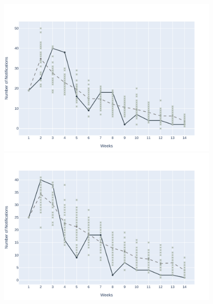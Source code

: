 \begin{figure}[!ht]
	\begin{minipage}[c]{.45\textwidth}
		\centering
		\includegraphics[scale=0.4]{images/experiments-as/AS-2017-01-08.pdf}
	\end{minipage}
	\hspace{0.5cm}
	\begin{minipage}[c]{.45\textwidth}
		\centering
		\includegraphics[scale=0.4]{images/experiments-as/AS-2017-01-15.pdf}
	\end{minipage}
	\\
	\begin{minipage}[c]{.45\textwidth}
		\centering

\end{minipage}
\end{figure}
